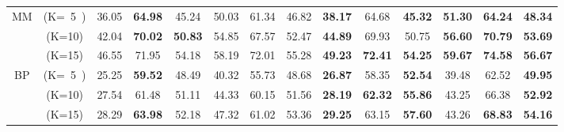 \begin{table*}[th]
\begin{tabular}{|c|c|cccccc|cccccc|}
\multirow{3}{*}{MM}
 & (K=~5~) &36.05 & \textbf{64.98}& 45.24&50.03 &61.34 & 46.82&\textbf{38.17} &64.68 & \textbf{45.32}& \textbf{51.30}& \textbf{64.24}& \textbf{48.34} \\
 & (K=10) &42.04 & \textbf{70.02}& \textbf{50.83} &54.85 &67.57 &52.47&\textbf{44.89} &69.93 & 50.75& \textbf{56.60}& \textbf{70.79} &\textbf{53.69} \\ 
 & (K=15) &46.55& 71.95&54.18 &58.19 &72.01 &55.28&\textbf{49.23} & \textbf{72.41}& \textbf{54.25}& \textbf{59.67}& \textbf{74.58}& \textbf{56.67} \\ \hline

\multirow{3}{*}{BP}
 & (K=~5~) &25.25&\textbf{59.52}&48.49&\textcolor[rgb]{0.45,0.45,0.45}{40.32}&55.73&48.68 &\textbf{26.87}&58.35&\textbf{52.54}&\textcolor[rgb]{0.45,0.45,0.45}{39.48}&62.52&\textbf{49.95} \\
 & (K=10) &27.54&61.48&51.11&\textcolor[rgb]{0.45,0.45,0.45}{44.33}&60.15&51.56 &\textbf{28.19}&\textbf{62.32}&\textbf{55.86}&\textcolor[rgb]{0.45,0.45,0.45}{43.25}&66.38&\textbf{52.92} \\
 & (K=15) &28.29&\textbf{63.98}&52.18&47.32&61.02&53.36 &\textbf{29.25}&63.15&\textbf{57.60}&\textcolor[rgb]{0.45,0.45,0.45}{43.26}&\textbf{68.83}&\textbf{54.16} \\ \hline
\end{tabular}
\end{table*}
